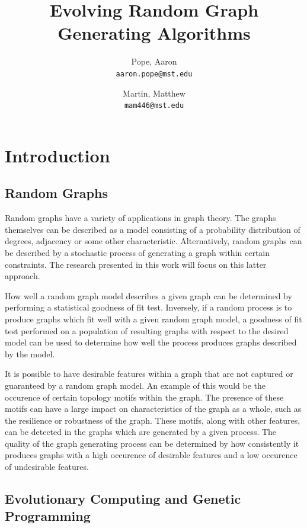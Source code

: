 \documentclass{article}
\begin{document}
\title{Evolving Random Graph Generating Algorithms}

\author{
Pope, Aaron\\
\texttt{aaron.pope@mst.edu}
\and
Martin, Matthew\\
\texttt{mam446@mst.edu}
}

\maketitle

\section{Introduction}

\subsection{Random Graphs}

Random graphs have a variety of applications in graph theory. The graphs themselves can be described as a model consisting of a probability distribution of degrees, adjacency or some other characteristic. Alternatively, random graphs can be described by a stochastic process of generating a graph within certain constraints. The research presented in this work will focus on this latter approach.

How well a random graph model describes a given graph can be determined by performing a statistical goodness of fit test. Inversely, if a random process is to produce graphs which fit well with a given random graph model, a goodness of fit test performed on a population of resulting graphs with respect to the desired model can be used to determine how well the process produces graphs described by the model. 

It is possible to have desirable features within a graph that are not captured or guaranteed by a random graph model. An example of this would be the occurence of certain topology motifs within the graph. The presence of these motifs can have a large impact on characteristics of the graph as a whole, such as the resilience or robustness of the graph. These motifs, along with other features, can be detected in the graphs which are generated by a given process. The quality of the graph generating process can be determined by how consistently it produces graphs with a high occurence of desirable features and a low occurence of undesirable features.

\subsection{Evolutionary Computing and Genetic Programming}
\end{document}
